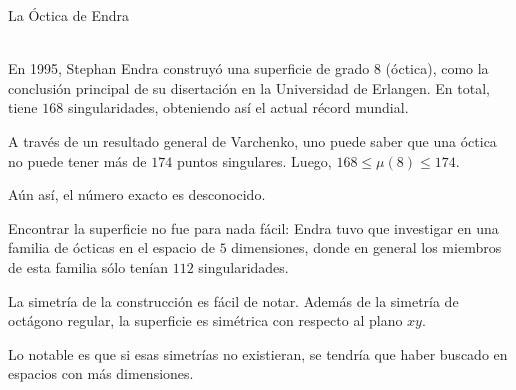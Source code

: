 \documentclass[es]{../../common/SurferDesc}%
\begin{document}
\footnotesize




\begin{surferPage}
  \begin{surferTitle}La Óctica de Endra\end{surferTitle} \\
    En 1995, Stephan Endra construyó una superficie de grado $8$ (óctica),
    como la conclusión principal de su disertación en la Universidad de Erlangen.
    En total, tiene $168$ singularidades, obteniendo así el actual récord mundial.
    
    A través de un resultado general de Varchenko, uno puede saber que una óctica
    no puede tener más de $174$ puntos singulares. Luego, $168 \le \mu(8) \le 174$. 
    
    Aún así, el número exacto es desconocido.

    Encontrar la superficie no fue para nada fácil: Endra tuvo que investigar en una
    familia de ócticas en el espacio de $5$ dimensiones, donde en general los
    miembros de esta familia sólo tenían $112$ singularidades.

    La simetría de la construcción es fácil de notar. Además de la simetría de
    octágono regular, la superficie es simétrica con respecto al plano $xy$.

    Lo notable es que si esas simetrías no existieran, se tendría que haber buscado en
    espacios con más dimensiones.
  \begin{surferText}
     \end{surferText}
\end{surferPage}
\end{document}
